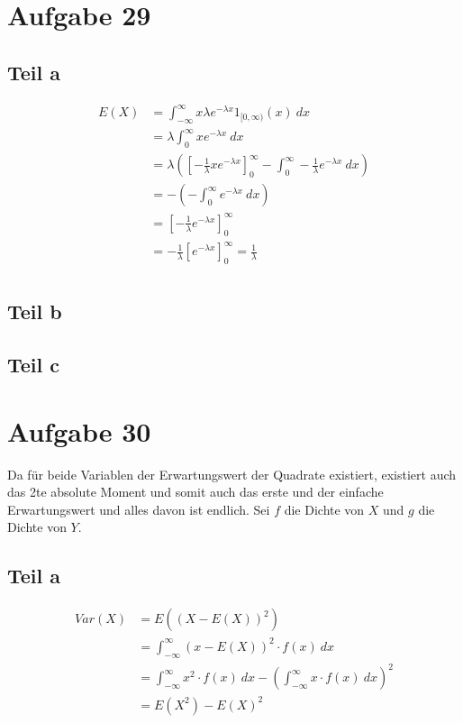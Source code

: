 \documentclass[10pt,a4paper]{article}
\begin{document}
\section{Aufgabe 29}

\subsection{Teil a}
\begin{align*}
  E(X) & = \int_{-\infty}^{\infty} x \lambda e^{-\lambda x} 1_{[0, \infty)}(x)\ dx\\
  & = \lambda \int_{0}^{\infty} x e^{-\lambda x}\ dx\\
  & = \lambda \left( \left[ -\frac{1}{\lambda} x e^{-\lambda x} \right]_{0}^{\infty} - \int_{0}^{\infty} -\frac{1}{\lambda} e^{-\lambda x}\ dx \right)\\
  & = -\left( -\int_{0}^{\infty} e^{-\lambda x}\ dx \right)\\
  & = \left[ -\frac{1}{\lambda} e^{-\lambda x} \right]_{0}^{\infty}\\
  & = -\frac{1}{\lambda} \left[ e^{-\lambda x} \right]_{0}^{\infty} = \frac{1}{\lambda}\\
\end{align*}

\subsection{Teil b}

\subsection{Teil c}

\section{Aufgabe 30}
Da für beide Variablen der Erwartungswert der Quadrate existiert, existiert auch das 2te absolute Moment und somit auch das erste und der einfache Erwartungswert und alles davon ist endlich.
Sei $f$ die Dichte von $X$ und $g$ die Dichte von $Y$.

\subsection{Teil a}
\begin{align*}
  Var(X) & = E((X - E(X))^{2})\\
  & = \int_{-\infty}^{\infty} (x - E(X))^{2} \cdot f(x)\ dx\\
  & = \int_{-\infty}^{\infty} x^{2} \cdot f(x)\ dx - \left( \int_{-\infty}^{\infty} x \cdot f(x)\ dx \right)^{2}\\
  & = E(X^{2}) - E(X)^{2}
\end{align*}
\end{document}
